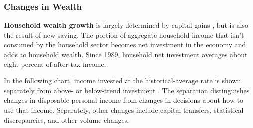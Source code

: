\subsubsection*{Changes in Wealth}
\begin{minipage}{0.76\textwidth}  
\small \textbf{Household wealth growth} is largely determined by capital gains , but is also the result of new saving. The portion of aggregate household income that isn't consumed by the household sector becomes net investment in the economy and adds to household wealth. Since 1989, household net investment averages about eight percent of after-tax income.

In the following chart, income invested at the historical-average rate  is shown separately from above- or below-trend investment . The separation distinguishes changes in disposable personal income from changes in decisions about how to use that income. Separately, other changes  include capital transfers, statistical discrepancies, and other volume changes.
\vspace{2mm}

\vspace{4.8cm}

\hspace{5mm} 

\vspace{3mm}

\small 
\end{minipage}
\newpage
